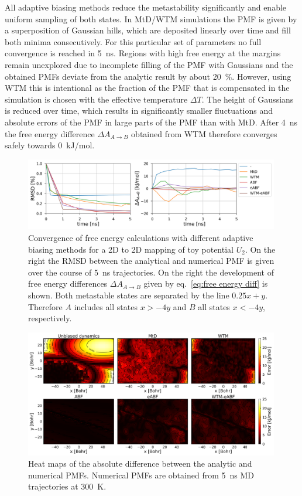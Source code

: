 All adaptive biasing methods reduce the metastability significantly and enable uniform sampling of both states.
In MtD/WTM simulations the PMF is given by a superposition of Gaussian hills, which are deposited linearly over time and fill both minima consecutively.
For this particular set of parameters no full convergence is reached in 5~ns.
Regions with high free energy at the margins remain unexplored due to incomplete filling of the PMF with Gaussians and the obtained PMFs deviate from the analytic result by about 20~\%.
However, using WTM this is intentional as the fraction of the PMF that is compensated in the simulation is chosen with the effective temperature $\Delta T$.
The height of Gaussians is reduced over time, which results in significantly smaller fluctuations and absolute errors of the PMF in large parts of the PMF than with MtD.
After 4~ns the free energy difference $\Delta A_{A\to B}$ obtained from WTM therefore converges safely towards 0~kJ/mol.
\begin{figure}[H]
   \centering
   \includegraphics[width=0.99\textwidth]{bilder/test_2D/conv}
   \caption{Convergence of free energy calculations with different adaptive biasing methods for a 2D to 2D mapping of toy potential $U_2$. On the right the RMSD between the analytical and numerical PMF is given over the course of 5~ns trajectories. On the right the development of free energy differences $\Delta A_{A\to B}$ given by eq.~\ref{eq:free energy diff} is shown. Both metastable states are separated by the line $0.25x+y$. Therefore $A$ includes all states $x>-4y$ and $B$ all states $x<-4y$, respectively.}
 \label{fig:conv 2D}%
\end{figure}
\begin{figure}[H]
  \centering
  \includegraphics[width=0.99\textwidth]{bilder/test_2D/error_5ns}
  \caption{Heat maps of the absolute difference between the analytic and numerical PMFs. Numerical PMFs are obtained from 5~ns MD trajectories at 300~K.}
\label{fig:error 2D}%
\end{figure}
